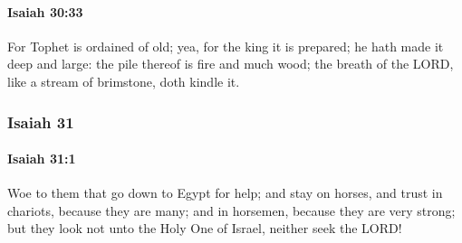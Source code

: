 		\paragraph{Isaiah 30:33} %
			\label{ISAIAH-30-33}

			For Tophet is ordained of old; yea, for the king it is prepared; he hath made it deep and large: the pile thereof is fire and much wood; the breath of the LORD, like a stream of brimstone, doth kindle it.

	\subsubsection{Isaiah 31} %
		\label{ISAIAH-31}

		\paragraph{Isaiah 31:1} %
			\label{ISAIAH-31-1}

			Woe to them that go down to Egypt for help; and stay on horses, and trust in chariots, because they are many; and in horsemen, because they are very strong; but they look not unto the Holy One of Israel, neither seek the LORD!

